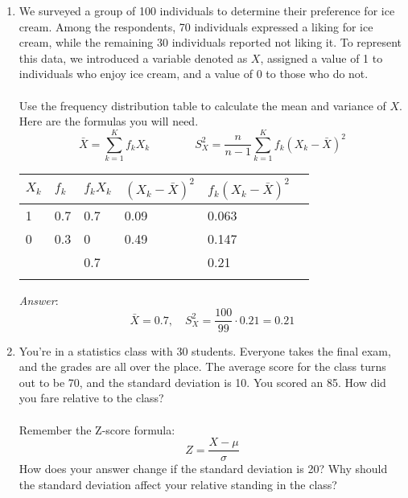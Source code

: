 \documentclass{./../../Latex/handout}
\begin{document}
\thispagestyle{plain}
\begin{center}
\end{center}	

\begin{enumerate}
\item We surveyed a group of 100 individuals to determine their preference for ice cream. Among the respondents, 70 individuals expressed a liking for ice cream, while the remaining 30 individuals reported not liking it. To represent this data, we introduced a variable denoted as $X$, assigned a value of 1 to individuals who enjoy ice cream, and a value of 0 to those who do not.  \\~\\
Use the frequency distribution table to calculate the mean and variance of $X$. Here are the formulas you will need.
$$ \bar{X} = \sum_{k=1}^K f_k X_k \quad \quad \quad \quad S^2_X = \frac{n}{n-1} \sum_{k=1}^K f_k (X_k-\bar{X})^2 $$

\begin{tabularx}{0.8\textwidth}{p{1cm}p{1cm}YYYY}
\toprule
$X_k$ & $f_k$ & $f_k X_k$ & $(X_k-\bar{X})^2$ & $f_k(X_k-\bar{X})^2$\\
 & 0.7 & 0.7 & 0.09 & 0.063 \\
0 & 0.3 & 0 & 0.49 & 0.147 \\ \midrule
 & & 0.7 &  & 0.21 \\
\bottomrule \\
\end{tabularx}

\textit{Answer}: $$ \bar{X} = 0.7, \quad  S^2_X = \frac{100}{99} \cdot 0.21 = 0.21 $$

\newpage
\item You're in a statistics class with 30 students. Everyone takes the final exam, and the grades are all over the place. The average score for the class turns out to be 70, and the standard deviation is 10. You scored an 85. How did you fare relative to the class? \\~\\
Remember the Z-score formula:
$$ Z = \frac{X-\mu}{\sigma}   $$
How does your answer change if the standard deviation is 20? Why should the standard deviation affect your relative standing in the class? \\


\end{enumerate}
\end{document}
